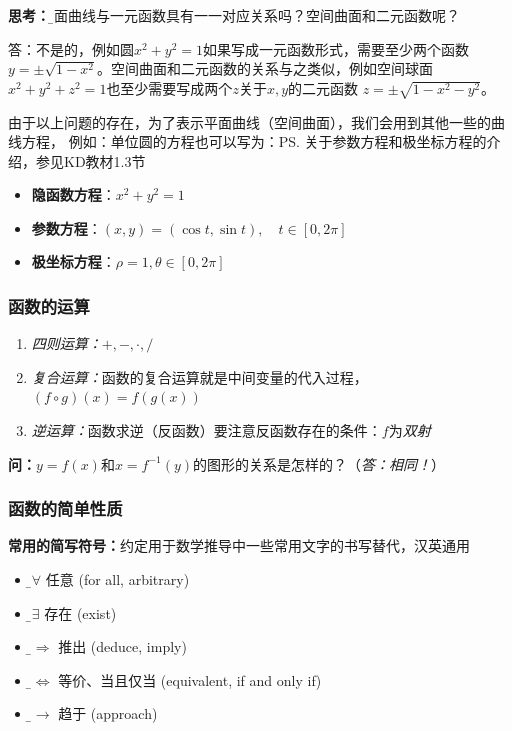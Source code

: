 	{\bf 思考：}{\b 平面曲线与一元函数具有一一对应关系吗？}空间曲面和二元函数呢？
	
	答：不是的，例如圆$x^2+y^2=1$如果写成一元函数形式，需要至少两个函数
	$y=\pm\sqrt{1-x^2}$。空间曲面和二元函数的关系与之类似，例如空间球面
	$x^2+y^2+z^2=1$也至少需要写成两个$z$关于$x,y$的二元函数
	$z=\pm\sqrt{1-x^2-y^2}$。
	
	由于以上问题的存在，为了表示平面曲线（空间曲面），我们会用到其他一些的曲线方程，
	例如：单位圆的方程也可以写为：\ps{关于参数方程和极坐标方程的介绍，参见KD教材1.3节}
	\begin{itemize}
		\item {\bf 隐函数方程}：$x^2+y^2=1$
		\item {\bf 参数方程}：$(x,y)=(\cos t,\sin t),\quad t\in[0,2\pi]$
		\item {\bf 极坐标方程}：$\rho=1,\theta\in[0,2\pi]$
	\end{itemize}
	
\subsubsection{函数的运算}

\begin{enumerate}
  \setlength{\itemindent}{1cm}
  \item {\it 四则运算：}$+,-,\cdot,/$
  \item {\it 复合运算：}函数的复合运算就是中间变量的代入过程，$(f\circ g)(x)=f(g(x))$
  \item {\it 逆运算：}函数求逆（反函数）要注意反函数存在的条件：$f$为{\it 双射}
\end{enumerate}

{\bf 问：}$y=f(x)$和$x=f^{-1}(y)$的图形的关系是怎样的？（{\it 答：相同！}）

\subsubsection{函数的简单性质}
	
\begin{shaded}
	{\bf 常用的简写符号：}约定用于数学推导中一些常用文字的书写替代，汉英通用
	\begin{itemize}
	  \setlength{\itemindent}{1cm}
	  \item {\b$\bm{\forall}$} \quad 任意 (for all, arbitrary)
	  \item {\b$\bm{\exists}$} \quad 存在 (exist)
	  \item {\b$\bm{\Rightarrow}$} \quad 推出 (deduce, imply)
	  \item {\b$\bm{\Leftrightarrow}$} \quad 等价、当且仅当 (equivalent, if and only if)
	  \item {\b$\bm{\to}$} \quad 趋于 (approach)
	\end{itemize}
\end{shaded}

